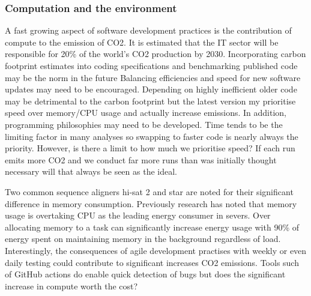 \documentclass[../main.tex]{subfiles}
\begin{document}




\subsubsection{Computation and the environment}

A fast growing aspect of software development practices is the contribution of compute to the emission of CO2.
It is estimated that the IT sector will be responsible for 20\% of the world's CO2 production by 2030. 
Incorporating carbon footprint estimates into coding specifications and benchmarking published code may be the norm in the future
Balancing efficiencies and speed for new software updates may need to be encouraged.
Depending on highly inefficient older code may be detrimental to the carbon footprint but the latest version my prioritise speed over memory/CPU usage and actually increase emissions.
In addition, programming philosophies may need to be developed. 
Time tends to be the limiting factor in many analyses so swapping to faster code is nearly always the priority. 
However, is there a limit to how much we prioritise speed? 
If each run emits more CO2 and we conduct far more runs than was initially thought necessary will that always be seen as the ideal.

Two common sequence aligners hi-sat 2 and star are noted for their significant difference in memory consumption.
Previously research has noted that memory usage is overtaking CPU as the leading energy consumer in severs.
Over allocating memory to a task can significantly increase energy usage with 90\% of energy spent on maintaining memory in the background regardless of load.
Interestingly, the consequences of agile development practises with weekly or even daily testing could contribute to significant increases CO2 emissions.
Tools such of GitHub actions do enable quick detection of bugs but does the significant increase in compute worth the cost?

\end{document}
